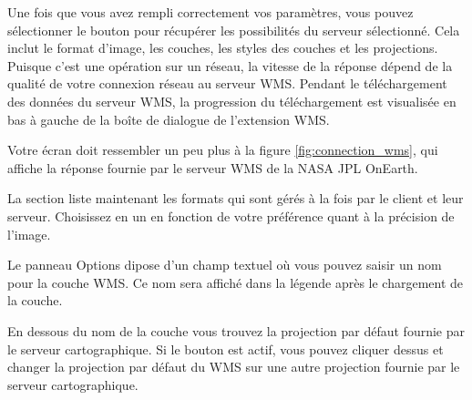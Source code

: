Une fois que vous avez rempli correctement vos paramètres, vous pouvez sélectionner le bouton  pour récupérer les possibilités du serveur sélectionné. Cela inclut le format d'image, les couches, les styles des couches et les projections. Puisque c'est une opération sur un réseau, la vitesse de la réponse dépend de la qualité de votre connexion réseau au serveur WMS. Pendant le téléchargement des données du serveur WMS, la progression du téléchargement est visualisée en bas à gauche de la boîte de dialogue de l'extension WMS.

Votre écran doit ressembler un peu plus à la figure \ref{fig:connection_wms}, qui affiche la réponse fournie par le serveur WMS de la NASA JPL OnEarth.


La section  liste maintenant les formats qui sont gérés à la fois par le client et leur serveur. Choisissez en un en fonction de votre préférence quant à la précision de l'image.


Le panneau Options dipose d'un champ textuel où vous pouvez saisir un nom 
pour la couche WMS. Ce nom sera affiché dans la légende après le chargement 
de la couche.

En dessous du nom de la couche vous trouvez la projection par défaut fournie par le serveur cartographique.
Si le bouton  est actif, vous pouvez cliquer dessus et changer la projection
par défaut du WMS sur une autre projection fournie par le serveur cartographique.

